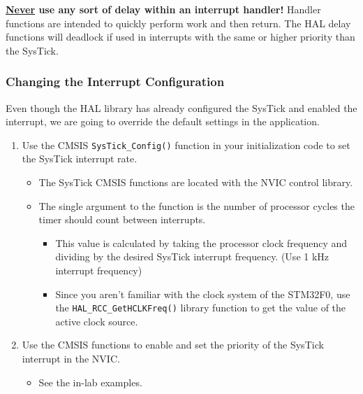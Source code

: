 \documentclass[11pt,fleqn]{book} %
\begin{document}
\begin{warning}
    \textbf{\underline{Never} use any sort of delay within an interrupt handler!} Handler functions are intended to quickly perform work and then return. The HAL delay functions will deadlock if used in interrupts with the same or higher priority than the SysTick.
\end{warning}

\subsubsection{Changing the Interrupt Configuration}
Even though the HAL library has already configured the SysTick and enabled the interrupt, we are going to override the default settings in the application. 

\begin{enumerate}
    \item Use the CMSIS \texttt{SysTick\_Config()} function in your initialization code to set the SysTick interrupt rate. 
    \begin{itemize}
        \item The SysTick CMSIS functions are located with the NVIC control library.
        \item The single argument to the function is the number of processor cycles the timer should count between interrupts. 
        \begin{itemize}
            \item This value is calculated by taking the processor clock frequency and dividing by the desired SysTick interrupt frequency. (Use 1 kHz interrupt frequency)
            \item Since you aren't familiar with the clock system of the STM32F0, use the \texttt{HAL\_RCC\_GetHCLKFreq()} library function to get the value of the active clock source. 
        \end{itemize}
    \end{itemize}
    \item Use the CMSIS functions to enable and set the priority of the SysTick interrupt in the NVIC. 
    \begin{itemize}
        \item See the in-lab examples.
    \end{itemize}
\end{enumerate}


\end{document}

